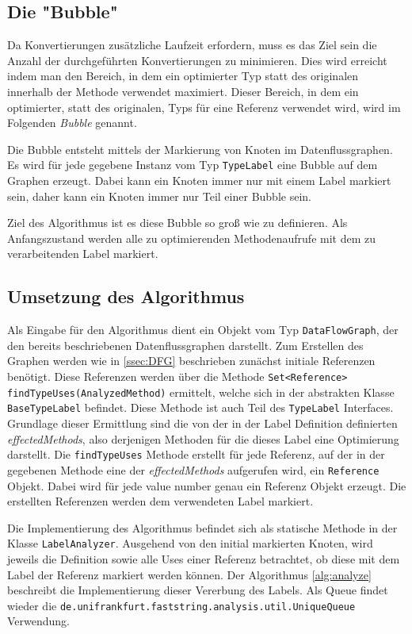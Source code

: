 \subsection{Die "Bubble"}

Da Konvertierungen zusätzliche Laufzeit erfordern, muss es das Ziel sein die Anzahl 
der durchgeführten Konvertierungen zu minimieren. Dies wird erreicht indem man den
Bereich, in dem ein optimierter Typ statt des originalen innerhalb der Methode 
verwendet maximiert. Dieser Bereich, in dem ein optimierter, statt des originalen, 
Typs für eine Referenz verwendet wird, wird im Folgenden \textit{Bubble} genannt. 

Die Bubble entsteht mittels der Markierung von Knoten im Datenflussgraphen. Es wird 
für jede gegebene Instanz vom Typ \texttt{TypeLabel} eine Bubble auf dem Graphen 
erzeugt. Dabei kann ein Knoten immer nur mit einem Label markiert sein, daher kann
ein Knoten immer nur Teil einer Bubble sein.

Ziel des Algorithmus ist es diese Bubble so groß wie zu definieren. Als Anfangszustand 
werden alle zu optimierenden Methodenaufrufe mit dem zu verarbeitenden Label markiert.

\subsection{Umsetzung des Algorithmus}\label{ssec:umAlg}

Als Eingabe für den Algorithmus dient ein Objekt vom Typ \texttt{DataFlowGraph}, der 
den bereits beschriebenen Datenflussgraphen darstellt. Zum Erstellen des Graphen werden
wie in \ref{ssec:DFG} beschrieben zunächst initiale Referenzen benötigt. Diese Referenzen
werden über die Methode \texttt{Set<Reference>} \\ \texttt{findTypeUses(AnalyzedMethod)} ermittelt, 
welche sich in der abstrakten Klasse \texttt{BaseTypeLabel} befindet. Diese Methode ist auch Teil des 
\texttt{TypeLabel} Interfaces. Grundlage dieser Ermittlung sind die von der in der Label 
Definition definierten \textit{effectedMethods}, also derjenigen Methoden für die dieses 
Label eine Optimierung darstellt. Die \texttt{findTypeUses} Methode erstellt für jede 
Referenz, auf der in der gegebenen Methode eine der \textit{effectedMethods} aufgerufen 
wird, ein \texttt{Reference} Objekt. Dabei wird für jede value number genau ein Referenz 
Objekt erzeugt. Die erstellten Referenzen werden dem verwendeten Label markiert.

Die Implementierung des Algorithmus befindet sich als statische Methode in der Klasse 
\texttt{LabelAnalyzer}. Ausgehend von den initial markierten Knoten, wird jeweils die 
Definition sowie alle Uses einer Referenz betrachtet, ob diese mit dem Label der Referenz 
markiert werden können. Der Algorithmus \ref{alg:analyze} beschreibt die Implementierung 
dieser Vererbung des Labels. Als Queue findet wieder die 
\texttt{de.unifrankfurt.faststring.analysis.util.UniqueQueue} Verwendung.

